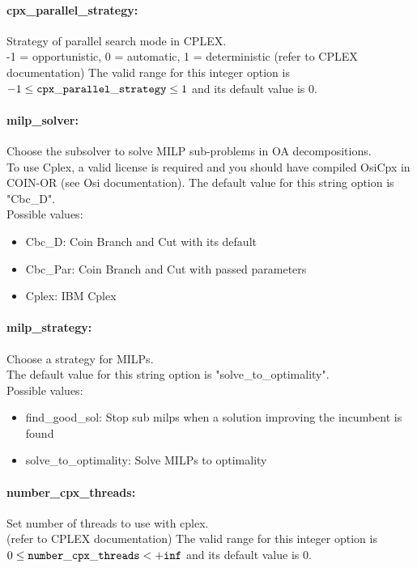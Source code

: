 \paragraph{cpx\_parallel\_strategy:}\label{opt:cpx_parallel_strategy} Strategy of parallel search mode in CPLEX. \\
 -1 = opportunistic, 0 = automatic, 1 = deterministic (refer to CPLEX documentation) The valid range for this integer option is
$-1 \le {\tt cpx\_parallel\_strategy } \le 1$
and its default value is $0$.


\paragraph{milp\_solver:}\label{opt:milp_solver} Choose the subsolver to solve MILP sub-problems in OA decompositions. \\
  To use Cplex, a valid license is required and you should have compiled OsiCpx in COIN-OR  (see Osi documentation). The default value for this string option is "Cbc\_D".
\\ 
Possible values:
\begin{itemize}
   \item Cbc\_D: Coin Branch and Cut with its default
   \item Cbc\_Par: Coin Branch and Cut with passed parameters
   \item Cplex: IBM Cplex
\end{itemize}

\paragraph{milp\_strategy:}\label{opt:milp_strategy} Choose a strategy for MILPs. \\
 The default value for this string option is "solve\_to\_optimality".
\\ 
Possible values:
\begin{itemize}
   \item find\_good\_sol: Stop sub milps when a solution improving the incumbent is found
   \item solve\_to\_optimality: Solve MILPs to optimality
\end{itemize}

\paragraph{number\_cpx\_threads:}\label{opt:number_cpx_threads} Set number of threads to use with cplex. \\
 (refer to CPLEX documentation) The valid range for this integer option is
$0 \le {\tt number\_cpx\_threads } <  {\tt +inf}$
and its default value is $0$.


